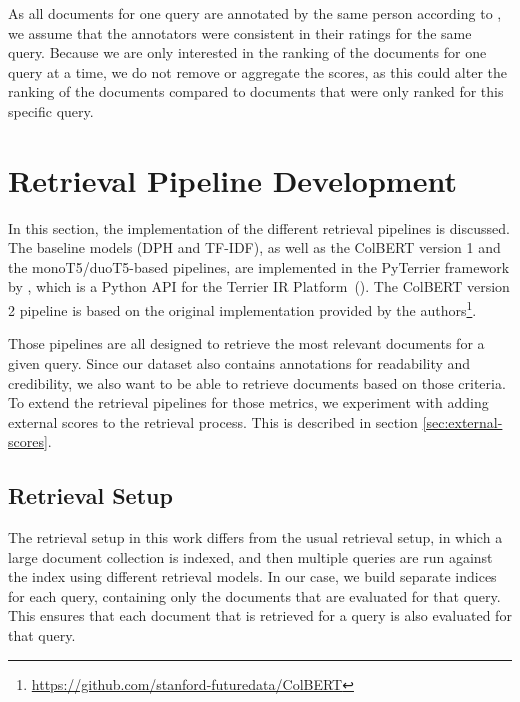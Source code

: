 As all documents for one query are annotated by the same person according to \cite{goeuriot:2021:Consumer}, we assume that the annotators were consistent in their ratings for the same query.
Because we are only interested in the ranking of the documents for one query at a time, we do not remove or aggregate the scores, as this could alter the ranking of the documents compared to documents that were only ranked for this specific query.

\section{Retrieval Pipeline Development}
In this section, the implementation of the different retrieval pipelines is discussed.
The baseline models (DPH and TF-IDF), as well as the ColBERT version 1 and the monoT5/duoT5-based pipelines, are implemented in the PyTerrier framework by \cite{pyterrier:2020:Declarative}, which is a Python API for the Terrier IR Platform~(\cite{macdonald:2012:From}).
The ColBERT version 2 pipeline is based on the original implementation provided by the authors\footnote{\url{https://github.com/stanford-futuredata/ColBERT}}.

Those pipelines are all designed to retrieve the most relevant documents for a given query.
Since our dataset also contains annotations for readability and credibility, we also want to be able to retrieve documents based on those criteria.
To extend the retrieval pipelines for those metrics, we experiment with adding external scores to the retrieval process.
This is described in section \ref{sec:external-scores}.

\subsection{Retrieval Setup}
The retrieval setup in this work differs from the usual retrieval setup, in which a large document collection is indexed, and then multiple queries are run against the index using different retrieval models.
In our case, we build separate indices for each query, containing only the documents that are evaluated for that query.
This ensures that each document that is retrieved for a query is also evaluated for that query.

